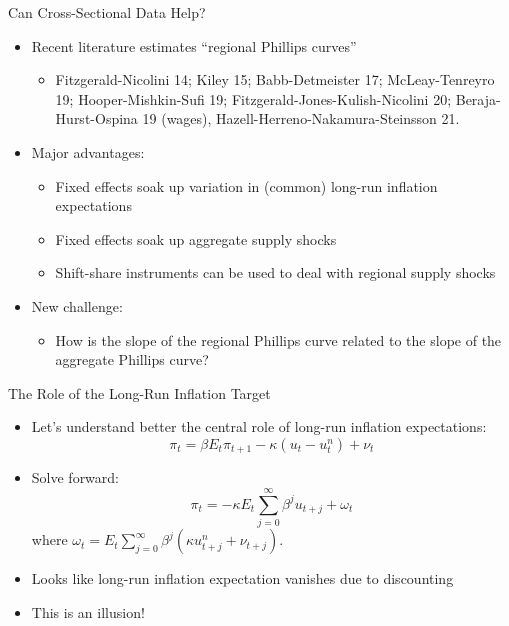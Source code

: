 \documentclass[10pt]{beamer}
\begin{document}
\begin{frame}{Can Cross-Sectional Data Help?}
	\begin{itemize}
		\itemsep1em
		\item Recent literature estimates ``regional Phillips curves''
		\begin{itemize}
			\item Fitzgerald-Nicolini 14; Kiley 15; Babb-Detmeister 17; McLeay-Tenreyro 19; Hooper-Mishkin-Sufi 19; Fitzgerald-Jones-Kulish-Nicolini 20; Beraja-Hurst-Ospina 19 (wages), Hazell-Herreno-Nakamura-Steinsson 21.
		\end{itemize}
		\item Major advantages:
		\begin{itemize}
			\item Fixed effects soak up variation in (common) long-run inflation expectations
			\item Fixed effects soak up aggregate supply shocks
			\item Shift-share instruments can be used to deal with regional supply shocks
		\end{itemize}
		\item New challenge:
		\begin{itemize}
			\item How is the slope of the regional Phillips curve related to the slope of the aggregate Phillips curve? 
		\end{itemize}
	\end{itemize}
\end{frame}

\begin{frame}{The Role of the Long-Run Inflation Target}
	\begin{itemize}
		\itemsep1em 
		\item Let's understand better the central role of long-run inflation expectations:
		\[\pi_{t}=\beta E_{t}\pi_{t+1}-\kappa (u_{t} - u_t^n)  + \nu_{t}  \]
		\item Solve forward:
		\[\pi_{t}=-\kappa E_{t}\sum_{j=0}^{\infty}\beta^{j} u_{t+j} + \omega_{t}\]
		where $\omega_t = E_t\sum_{j=0}^{\infty}\beta^{j}(\kappa u_{t+j}^{n} + \nu_{t+j})$. 
		\item Looks like long-run inflation expectation vanishes due to discounting
		\item This is an illusion!
	\end{itemize}
\end{frame}	 
\end{document}
